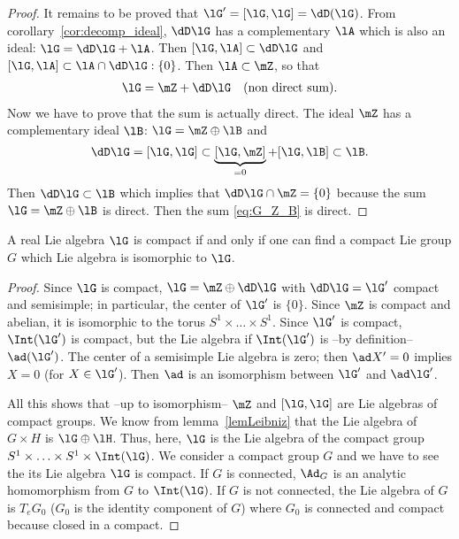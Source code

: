 \begin{theorem}
\begin{proof}
	It remains to be proved that $\lG'=[\lG,\lG]=\dD(\lG)$. From corollary~\ref{cor:decomp_ideal}, $\dD\lG$ has a complementary $\lA$ which is also an ideal: $\lG=\dD\lG+\lA$. Then $[\lG,\lA]\subset\dD\lG$ and $[\lG,\lA]\subset\lA\cap\dD\lG:\{0\}$. Then $\lA\subset\mZ$, so that
	\begin{align}\label{eq:G_Z_B}
		\lG=\mZ+\dD\lG &  & \text{(non direct sum)}.
	\end{align}
	Now we have to prove that the sum is actually direct. The ideal $\mZ$ has a complementary ideal $\lB$: $\lG=\mZ\oplus\lB$ and
	\[
		\dD\lG=[\lG,\lG]\subset\underbrace{[\lG,\mZ]}_{=0}+[\lG,\lB]\subset\lB.
	\]
	Then $\dD\lG\subset\lB$ which implies that $\dD\lG\cap\mZ=\{0\}$ because the sum $\lG=\mZ\oplus\lB$ is direct. Then the sum \eqref{eq:G_Z_B} is direct.

\end{proof}

\begin{proposition}
	A real Lie algebra $\lG$ is compact if and only if one can find a compact Lie group $G$ which Lie algebra is isomorphic to $\lG$.
	\label{prop:alg_grp_compact}
\end{proposition}

\begin{proof}
	 Since $\lG$ is compact, $\lG=\mZ\oplus\dD\lG$ with $\dD\lG=\lG'$ compact and semisimple; in particular, the center of $\lG'$ is $\{0\}$. Since $\mZ$ is compact and abelian, it is isomorphic to the torus $S^1\times\ldots\times S^1$. Since $\lG'$ is compact, $\Int(\lG')$ is compact, but the Lie algebra if $\Int(\lG')$ is --by definition--  $\ad(\lG')$. The center of a semisimple Lie algebra is zero; then $\ad X'=0$ implies $X=0$ (for $X\in\lG'$). Then $\ad$ is an isomorphism between $\lG'$ and $\ad\lG'$.

	All this shows that --up to isomorphism-- $\mZ$ and $[\lG,\lG]$ are Lie algebras of compact groups. We know from lemma~\ref{lemLeibniz} that the Lie algebra of $G\times H$ is $\lG\oplus\lH$. Thus, here, $\lG$ is the Lie algebra of the compact group $S^1\times\ldots\times S^1\times\Int(\lG)$.
	We consider a compact group $G$ and we have to see the its Lie algebra $\lG$ is compact. If $G$ is connected, $\Ad_G$ is an analytic homomorphism from $G$ to $\Int(\lG)$. If $G$ is not connected, the Lie algebra of $G$ is $T_eG_0$ ($G_0$ is the identity component of $G$) where $G_0$ is connected and compact because closed in a compact.
\end{proof}


\end{theorem}
